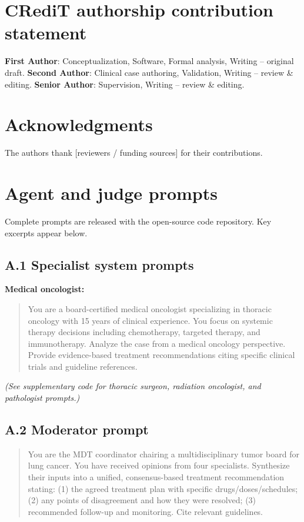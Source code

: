\documentclass[final, 11pt, 3p]{elsarticle}
\begin{document}
\section*{CRediT authorship contribution statement}
\textbf{First Author}: Conceptualization, Software, Formal analysis,
Writing -- original draft. \textbf{Second Author}: Clinical case
authoring, Validation, Writing -- review \& editing.
\textbf{Senior Author}: Supervision, Writing -- review \& editing.

\section*{Acknowledgments}
The authors thank [reviewers / funding sources] for their contributions.

\appendix
\section{Agent and judge prompts}
\label{app:prompts}

Complete prompts are released with the open-source code repository.
Key excerpts appear below.

\subsection*{A.1 Specialist system prompts}
\textbf{Medical oncologist:}
\begin{quote}\small
You are a board-certified medical oncologist specializing in thoracic
oncology with 15 years of clinical experience. You focus on systemic
therapy decisions including chemotherapy, targeted therapy, and
immunotherapy. Analyze the case from a medical oncology perspective.
Provide evidence-based treatment recommendations citing specific
clinical trials and guideline references.
\end{quote}
\emph{(See supplementary code for thoracic surgeon, radiation
oncologist, and pathologist prompts.)}

\subsection*{A.2 Moderator prompt}
\begin{quote}\small
You are the MDT coordinator chairing a multidisciplinary tumor board
for lung cancer. You have received opinions from four specialists.
Synthesize their inputs into a unified, consensus-based treatment
recommendation stating: (1) the agreed treatment plan with specific
drugs/doses/schedules; (2) any points of disagreement and how they
were resolved; (3) recommended follow-up and monitoring. Cite
relevant guidelines.
\end{quote}
\end{document}

